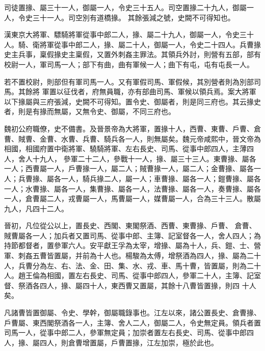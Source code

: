 \begin{pinyinscope}
 司徒置掾、屬三十一人，御屬一人，令史三十五人。司空置掾二十九人，御屬一人，令史三十一人。司空別有道橋掾。
 其餘張減之號，史闕不可得知也。



 漢東京大將軍、驃騎將軍從事中郎二人，掾、屬二十九人，御屬一人，令史三十人。騎、衛將軍從事中郎二人，掾、屬二十人，御屬一人，令史二十四人。兵曹掾史主兵事，稟假掾史主稟假，又置外刺姦主罪法。其領兵外討，則營有五部，部有校尉一人，軍司馬一人；部下有曲，曲有軍候一人；曲下有屯，屯有屯長一人。



 若不置校尉，則部但有軍司馬一人。又有軍假司馬、軍假候，其別營者則為別部司馬。其餘將
 軍置以征伐者，府無員職，亦有部曲司馬、軍候以領兵焉。案大將軍以下掾屬與三府張減，史闕不可得知。置令史、御屬者，則是同三府也。其云掾史者，則是有掾而無屬，又無令史、御屬，不同三府也。



 魏初公府職僚，史不備書。及晉景帝為大將軍，置掾十人，西曹、東曹、戶曹、倉曹、賊曹、金曹、水曹、兵曹、騎兵各一人，則無屬矣。魏元帝咸熙中，晉文帝為相國，相國府置中衛將軍、驍騎將軍、左右長史、司馬、從事中郎四人，主薄四人，舍人十九人，
 參軍二十二人，參戰十一人，掾、屬三十三人。東曹掾、屬各一人；西曹屬一人，戶曹掾一人，屬二人；賊曹掾一人，屬二人；金曹掾、屬各一人；兵曹掾、屬各一人，騎兵掾二人，屬一人；車曹掾、屬各一人；鎧曹掾、屬各一人；水曹掾、屬各一人，集曹掾、屬各一人，法曹掾、屬各一人，奏曹掾、屬各一人，倉曹屬二人，戎曹屬一人，馬曹屬一人，媒曹屬一人，合為三十三人。散屬九人，凡四十二人。



 晉初，凡位從公以上，置長史、西閣、東閣祭酒、西曹、東曹掾、戶曹、
 倉曹、賊曹屬各一人；加兵者又置司馬、從事中郎、主簿、記室督各一人，舍人四人；為持節都督者，置參軍六人。安平獻王孚為太宰，增掾、屬為十人，兵、鎧、士、營軍、刺姦五曹皆置屬，并前為十人也。楊駿為太傅，增祭酒為四人，掾、屬為二十人，兵曹分為左、右、法、金、田、集、水、戎、車、馬十曹，皆置屬，則為二十人。趙王倫為相國，置左右長史、司馬、從事中郎四人，參軍二十人，主簿、記室督、祭酒各四人，掾、屬四十人，東西曹又置屬，其餘十八曹皆置掾，則四
 十人矣。



 凡諸曹皆置御屬、令史、學幹，御屬職錄事也。江左以來，諸公置長史、倉曹掾、戶曹屬、東西閣祭酒各一人，主簿、舍人二人，御屬二人，令史無定員。領兵者置司馬一人，從事中郎二人，參軍無定員；加崇者置左右長史、司馬、從事中郎四人，掾、屬四人，則倉曹增置屬，戶曹置掾，江左加崇，極於此也。




\end{pinyinscope}
